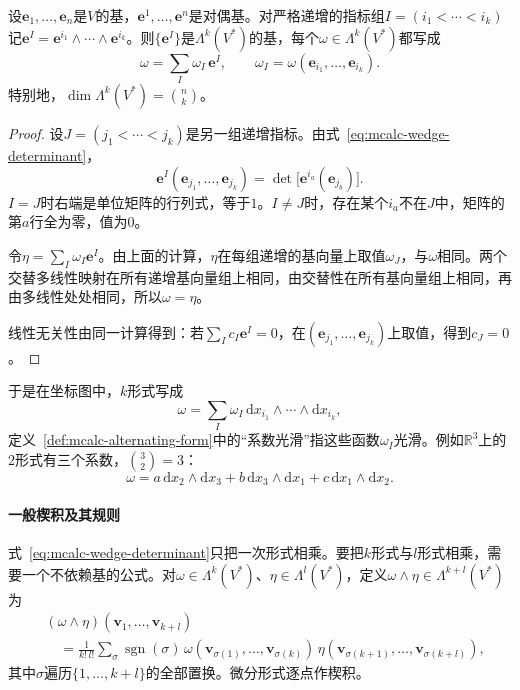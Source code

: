 \begin{theorem}[交替形式的基]
\label{thm:mcalc-alternating-basis}
设$\bm e_1,\ldots,\bm e_n$是$V$的基，$\bm e^1,\ldots,\bm e^n$是对偶基。对严格递增的指标组$I=(i_1<\cdots<i_k)$记$\bm e^I=\bm e^{i_1}\wedge\cdots\wedge\bm e^{i_k}$。则$\{\bm e^I\}$是$\Lambda^k(V^*)$的基，每个$\omega\in\Lambda^k(V^*)$都写成
\begin{equation}
\omega=\sum_{I}\omega_I\,\bm e^I,\qquad\omega_I=\omega(\bm e_{i_1},\ldots,\bm e_{i_k}).
\label{eq:mcalc-form-coefficients}
\end{equation}
特别地，$\dim\Lambda^k(V^*)=\binom nk$。
\end{theorem}

\begin{proof}
设$J=(j_1<\cdots<j_k)$是另一组递增指标。由式~\eqref{eq:mcalc-wedge-determinant}，
\[
\bm e^I(\bm e_{j_1},\ldots,\bm e_{j_k})=\det\bigl[\bm e^{i_a}(\bm e_{j_b})\bigr].
\]
$I=J$时右端是单位矩阵的行列式，等于$1$。$I\neq J$时，存在某个$i_a$不在$J$中，矩阵的第$a$行全为零，值为$0$。

令$\eta=\sum_I\omega_I\bm e^I$。由上面的计算，$\eta$在每组递增的基向量上取值$\omega_J$，与$\omega$相同。两个交替多线性映射在所有递增基向量组上相同，由交替性在所有基向量组上相同，再由多线性处处相同，所以$\omega=\eta$。

线性无关性由同一计算得到：若$\sum_Ic_I\bm e^I=0$，在$(\bm e_{j_1},\ldots,\bm e_{j_k})$上取值，得到$c_J=0$。
\end{proof}

于是在坐标图中，$k$形式写成
\[
\omega=\sum_I\omega_I\,\mathrm dx_{i_1}\wedge\cdots\wedge\mathrm dx_{i_k},
\]
定义~\ref{def:mcalc-alternating-form}中的“系数光滑”指这些函数$\omega_I$光滑。例如$\mathbb R^3$上的$2$形式有三个系数，$\binom32=3$：
\[
\omega=a\,\mathrm dx_2\wedge\mathrm dx_3+b\,\mathrm dx_3\wedge\mathrm dx_1+c\,\mathrm dx_1\wedge\mathrm dx_2 .
\]

\paragraph{一般楔积及其规则}
式~\eqref{eq:mcalc-wedge-determinant}只把一次形式相乘。要把$k$形式与$l$形式相乘，需要一个不依赖基的公式。对$\omega\in\Lambda^k(V^*)$、$\eta\in\Lambda^l(V^*)$，定义$\omega\wedge\eta\in\Lambda^{k+l}(V^*)$为
\begin{equation}
\begin{aligned}
&(\omega\wedge\eta)(\bm v_1,\ldots,\bm v_{k+l})\\
&\quad=\frac1{k!\,l!}\sum_\sigma\operatorname{sgn}(\sigma)\,\omega(\bm v_{\sigma(1)},\ldots,\bm v_{\sigma(k)})\,\eta(\bm v_{\sigma(k+1)},\ldots,\bm v_{\sigma(k+l)}),
\end{aligned}
\label{eq:mcalc-wedge-general}
\end{equation}
其中$\sigma$遍历$\{1,\ldots,k+l\}$的全部置换。微分形式逐点作楔积。

